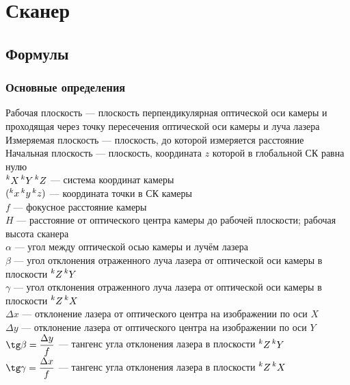 \documentclass[a4paper, 12pt]{article}
\begin{document}
    \section{Сканер}

    \subsection{Формулы}

    \subsubsection{Основные определения}
    
    Рабочая плоскость --- плоскость перпендикулярная оптической оси камеры и проходящая через точку пересечения оптической оси камеры и луча лазера\\
    Измеряемая плоскость --- плоскость, до которой измеряется расстояние\\
    Начальная плоскость --- плоскость, координата $z$ которой в глобальной СК равна нулю\\
    $\prescript{k}{}{X} \prescript{k}{}{Y} \prescript{k}{}{Z}$ --- система координат камеры\\
    $(\prescript{k}{}{x} \prescript{k}{}{y} \prescript{k}{}{z})$ --- координата точки в СК камеры\\
    $f$ --- фокусное расстояние камеры\\
    $H$ --- расстояние от оптического центра камеры до рабочей плоскости; рабочая высота сканера\\
    $\alpha$ --- угол между оптической осью камеры и лучём лазера\\
    $\beta$ --- угол отклонения отраженного луча лазера от оптической оси камеры в плоскости $\prescript{k}{}{Z}\prescript{k}{}{Y}$\\
    $\gamma$ --- угол отклонения отраженного луча лазера от оптической оси камеры в плоскости $\prescript{k}{}{Z}\prescript{k}{}{X}$\\
    $\Delta x$ --- отклонение лазера от оптического центра на изображении по оси $X$\\
    $\Delta y$ --- отклонение лазера от оптического центра на изображении по оси $Y$\\
    $\tg\beta = \dfrac{\Delta y}{f}$ --- тангенс угла отклонения лазера в плоскости $\prescript{k}{}{Z}\prescript{k}{}{Y}$\\
    $\tg\gamma = \dfrac{\Delta x}{f}$ --- тангенс угла отклонения лазера в плоскости $\prescript{k}{}{Z}\prescript{k}{}{X}$\\
\end{document}
